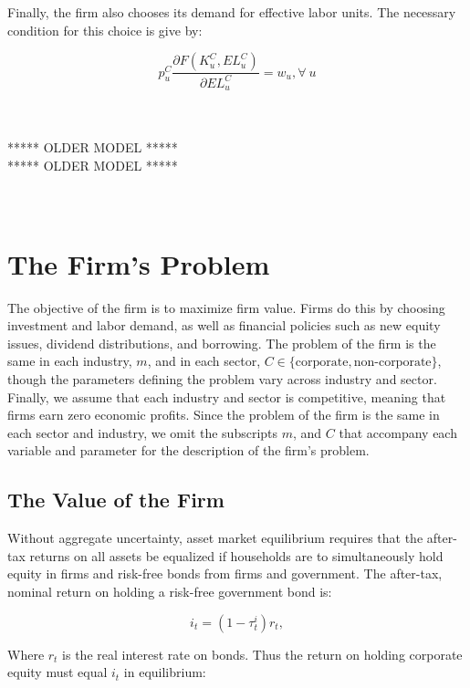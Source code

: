Finally, the firm also chooses its demand for effective labor units.  The necessary condition for this choice is give by:

\begin{equation}
\label{eqn:foc_l}
p^{C}_{u}\frac{\partial F(K^{C}_{u},EL^{C}_{u})}{\partial EL^{C}_{u}}=w_{u}, \forall \ u
\end{equation}


\ \\
\ \\
***** OLDER MODEL *****\\
***** OLDER MODEL *****\\
\ \\
\ \\

\section{The Firm's Problem}

The objective of the firm is to maximize firm value.  Firms do this by choosing investment and labor demand, as well as financial policies such as new equity issues, dividend distributions, and borrowing.  The problem of the firm is the same in each industry, $m$, and in each sector, $C\in\{\text{corporate},\text{non-corporate}\}$, though the parameters defining the problem vary across industry and sector.  Finally, we assume that each industry and sector is competitive, meaning that firms earn zero economic profits.  Since the problem of the firm is the same in each sector and industry, we omit the subscripts $m$, and $C$ that accompany each variable and parameter for the description of the firm's problem.

\subsection{The Value of the Firm}

Without aggregate uncertainty, asset market equilibrium requires that the after-tax returns on all assets be equalized if households are to simultaneously hold equity in firms and risk-free bonds from firms and government.  The after-tax, nominal return on holding a risk-free government bond is:

\begin{equation}
\label{eqn:r}
i_{t}=(1-\tau^{i}_{t})r_{t},
\end{equation}

\noindent\noindent Where $r_{t}$ is the real interest rate on bonds.  Thus the return on holding corporate equity must equal $i_{t}$ in equilibrium:

